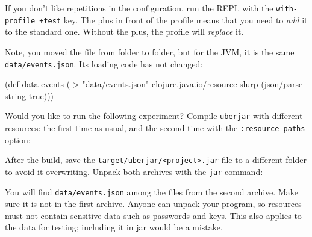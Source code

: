 

If you don't like repetitions in the configuration, run the REPL with the \verb|with-profile +test| key. The plus in front of the profile means that you need to \emph{add} it to the standard one. Without the plus, the profile will \emph{replace} it.


Note, you moved the file from folder to folder, but for the JVM, it is the same \verb|data/events.json|. Its loading code has not changed:

\begin{english}
  \begin{clojure}
(def data-events
  (-> "data/events.json"
      clojure.java.io/resource
      slurp
      (json/parse-string true)))
  \end{clojure}
\end{english}

Would you like to run the following experiment? Compile \verb|uberjar| with different resources: the first time as usual, and the second time with the \verb|:resource-paths| option:

\ifnarrow

\begin{english}
  \begin{clojure}
:profiles
  {:uberjar {:resource-paths
             ["env/test/resources"]}
  \end{clojure}
\end{english}

\else

\begin{english}
  \begin{clojure}
:profiles {:uberjar {:resource-paths ["env/test/resources"]}
  \end{clojure}
\end{english}

\fi

After the build, save the \texttt{target/uber\-jar/<project>.jar} file to a different folder to avoid it overwriting. Unpack both archives with the \verb|jar| command:

\begin{english}
\end{english}

You will find \verb|data/events.json| among the files from the second archive. Make sure it is not in the first archive. Anyone can unpack your program, so resources must not contain sensitive data such as passwords and keys. This also applies to the data for testing; including it in jar would be a mistake.

